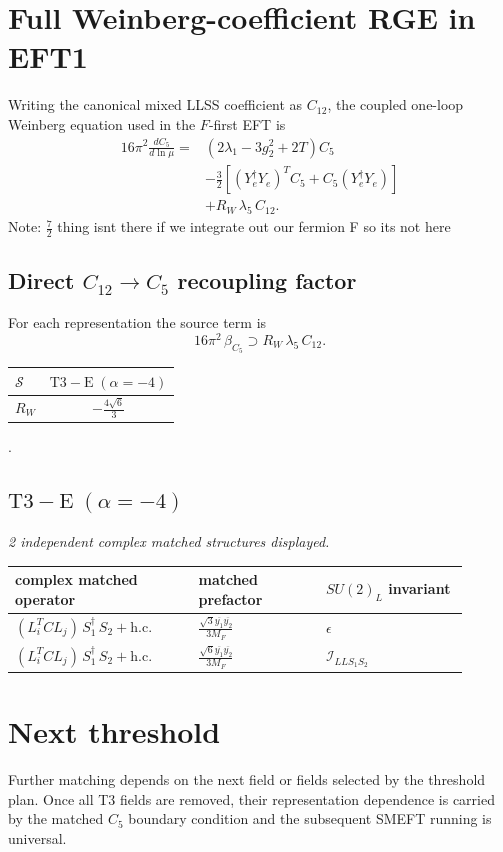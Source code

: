 \documentclass[9pt]{article}
\begin{document}
\section*{Full Weinberg-coefficient RGE in EFT1}
Writing the canonical mixed LLSS coefficient as $C_{12}$, the coupled one-loop Weinberg equation used in the $F$-first EFT is
\begin{align}
16\pi^2\frac{dC_5}{d\ln\mu}={}&(2\lambda_1-3g_2^2+2T)C_5\\
&-\frac32\left[(Y_e^\dagger Y_e)^T C_5+C_5(Y_e^\dagger Y_e)\right]\\
&+R_W\,\lambda_5\,C_{12}.
\end{align}
Note: $\frac{7}{2}$ thing isnt there if we integrate out our fermion F so its not here \subsection*{Direct $C_{12}\to C_5$ recoupling factor}
For each representation the source term is
\[16\pi^2\,\beta_{C_5}\supset R_W\,\lambda_5\,C_{12}.\]
\begin{longtable}{@{}lc@{}}
\toprule
$\mathcal{S}$ & $ \mathrm{T3-E}\;(\alpha=-4) $ \\
\midrule
$R_W$ & $ - \frac{4 \sqrt{6}}{3} $ \\
\bottomrule
\end{longtable}
.
\subsection*{$ \mathrm{T3-E}\;(\alpha=-4) $}
\textit{2 independent complex matched structures displayed. }
\begin{longtable}{@{}p{0.36\linewidth}p{0.25\linewidth}p{0.29\linewidth}@{}}
\toprule
complex matched operator & matched prefactor & $SU(2)_L$ invariant \\
\midrule
$ (L_i^T C L_j)\,S_1^\dagger\,S_2+\mathrm{h.c.} $ & $ \frac{\sqrt{3} \overline{y_{1}} \overline{y_{2}}}{3 M_F} $ & $ \epsilon $ \\
$ (L_i^T C L_j)\,S_1^\dagger\,S_2+\mathrm{h.c.} $ & $ \frac{\sqrt{6} \overline{y_{1}} \overline{y_{2}}}{3 M_F} $ & $ \mathcal{I}_{LLS_1S_2} $ \\
\bottomrule
\end{longtable}
\section*{Next threshold}
Further matching depends on the next field or fields selected by the threshold plan.  Once all T3 fields are removed, their representation dependence is carried by the matched $C_5$ boundary condition and the subsequent SMEFT running is universal.
\end{document}

